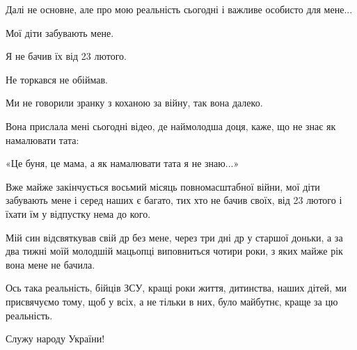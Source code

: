Далі не основне, але про мою реальність сьогодні і важливе особисто для мене...

Мої діти забувають мене.

Я не бачив їх від 23 лютого. 

Не торкався не обіймав.  

Ми не говорили зранку з коханою за війну, так вона далеко.

Вона прислала мені сьогодні відео, де наймолодша доця, каже, що не знає як
намалювати тата:

«Це буня, це мама, а як намалювати тата я не знаю...» 

Вже майже закінчується восьмий місяць повномасштабної війни, мої діти забувають
мене і серед наших є багато, тих хто не бачив своїх, від 23 лютого і їхати їм у
відпустку нема до кого.

Мій син відсвяткував свій др без мене, через три дні др у старшої доньки, а
за два тижні моїй молодшій мацьопці виповниться чотири роки, з яких майже рік
вона мене не бачила.

Ось така реальність, бійців ЗСУ, кращі роки життя, дитинства, наших дітей, ми
присвячуємо тому, щоб у всіх, а не тільки в них, було майбутнє, краще за цю
реальність.

Служу народу України!
